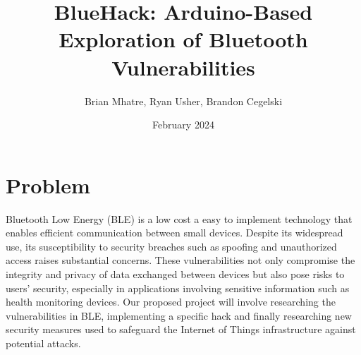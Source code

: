 \documentclass{article}
\title{BlueHack: Arduino-Based Exploration of Bluetooth Vulnerabilities}
\author{Brian Mhatre, Ryan Usher, Brandon Cegelski}
\date{February 2024}
\begin{document}
\maketitle

\section{Problem}
    Bluetooth Low Energy (BLE) is a low cost a easy to implement technology that enables efficient communication between small devices. Despite its widespread use, its susceptibility to security breaches
    such as spoofing and unauthorized access raises substantial concerns. These vulnerabilities not only compromise the integrity 
    and privacy of data exchanged between devices but also pose risks to users' security, especially in applications involving
    sensitive information such as health monitoring devices. Our proposed project will involve researching the vulnerabilities in BLE,
    implementing a specific hack and finally researching new security measures used to safeguard the Internet of Things infrastructure against
    potential attacks.
\end{document}
